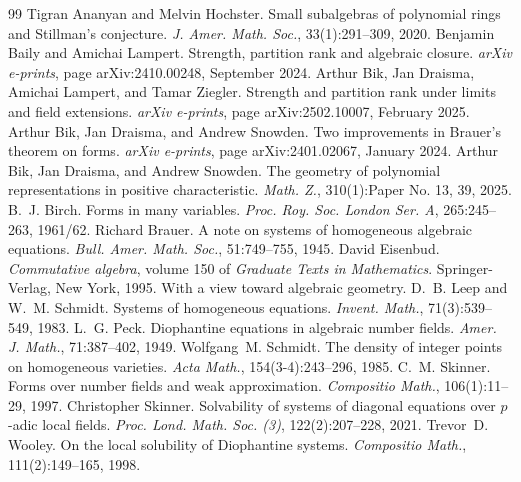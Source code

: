\documentclass[10pt,a4paper]{amsart}
\theoremstyle{definition}
\begin{document}
\begin{thebibliography}{99}
 Tigran Ananyan and Melvin Hochster. Small subalgebras of polynomial rings and {S}tillman's conjecture. {\em J. Amer. Math. Soc.}, 33(1):291--309, 2020.
 Benjamin {Baily} and Amichai {Lampert}. {Strength, partition rank and algebraic closure}. {\em arXiv e-prints}, page arXiv:2410.00248, September 2024.
 Arthur {Bik}, Jan {Draisma}, Amichai {Lampert}, and Tamar {Ziegler}. {Strength and partition rank under limits and field extensions}. {\em arXiv e-prints}, page arXiv:2502.10007, February 2025.
 Arthur {Bik}, Jan {Draisma}, and Andrew {Snowden}. {Two improvements in Brauer's theorem on forms}. {\em arXiv e-prints}, page arXiv:2401.02067, January 2024.
 Arthur Bik, Jan Draisma, and Andrew Snowden. The geometry of polynomial representations in positive characteristic. {\em Math. Z.}, 310(1):Paper No. 13, 39, 2025.
 B.~J. Birch. Forms in many variables. {\em Proc. Roy. Soc. London Ser. A}, 265:245--263, 1961/62.
 Richard Brauer. A note on systems of homogeneous algebraic equations. {\em Bull. Amer. Math. Soc.}, 51:749--755, 1945.
 David Eisenbud. {\em Commutative algebra}, volume 150 of {\em Graduate Texts in Mathematics}. Springer-Verlag, New York, 1995. With a view toward algebraic geometry.
 D.~B. Leep and W.~M. Schmidt. Systems of homogeneous equations. {\em Invent. Math.}, 71(3):539--549, 1983.
 L.~G. Peck. Diophantine equations in algebraic number fields. {\em Amer. J. Math.}, 71:387--402, 1949.
 Wolfgang~M. Schmidt. The density of integer points on homogeneous varieties. {\em Acta Math.}, 154(3-4):243--296, 1985.
 C.~M. Skinner. Forms over number fields and weak approximation. {\em Compositio Math.}, 106(1):11--29, 1997.
 Christopher Skinner. Solvability of systems of diagonal equations over {$p$}-adic local fields. {\em Proc. Lond. Math. Soc. (3)}, 122(2):207--228, 2021.
 Trevor~D. Wooley. On the local solubility of {D}iophantine systems. {\em Compositio Math.}, 111(2):149--165, 1998.
\end{thebibliography}
\end{document}
